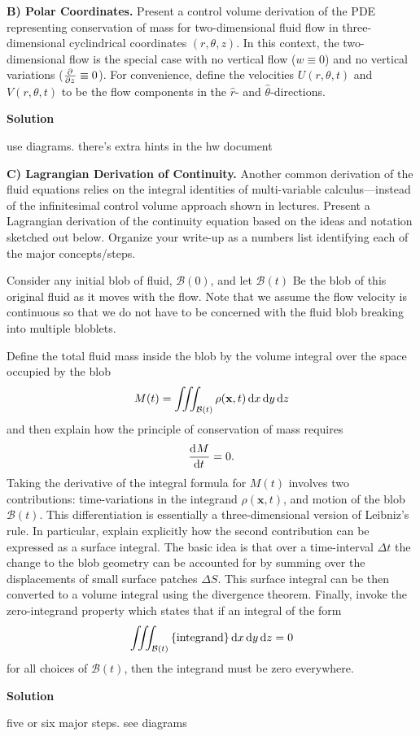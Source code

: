 \documentclass{article}
\def\*#1{\mathbf{#1}}
\newcommand{\B}{\mathcal{B}}
\begin{document}
\newpage

\textbf{B) Polar Coordinates.} Present a control volume derivation of
the PDE representing conservation of mass for two-dimensional fluid flow
in three-dimensional cyclindrical coordinates $(r, \theta, z)$. In this
context, the two-dimensional flow is the special case with no vertical
flow ($w \equiv 0$) and no vertical variations ($\pd{}{z} \equiv 0$).
For convenience, define the velocities $U(r, \theta, t)$ and $V(r,
\theta, t)$ to be the flow components in the $\hat{r}$- and
$\hat{\theta}$-directions.

\textbf{Solution}

use diagrams. there's extra hints in the hw document

\newpage

\textbf{C) Lagrangian Derivation of Continuity.} Another common
derivation of the fluid equations relies on the integral identities of
multi-variable calculus---instead of the infinitesimal control volume
approach shown in lectures. Present a Lagrangian derivation of the
continuity equation based on the ideas and notation sketched out below.
Organize your write-up as a numbers list identifying each of the major
concepts/steps.

Consider any initial blob of fluid, $\B(0)$, and let $\B(t)$ Be the blob
of this original fluid as it moves with the flow. Note that we assume
the flow velocity is continuous so that we do not have to be concerned
with the fluid blob breaking into multiple bloblets.

Define the total fluid mass inside the blob by the volume integral over
the space occupied by the blob
%
\begin{equation*}
    M(t) = \iiint_{\B(t)} \rho(\*x, t) \dif x \dif y \dif z
\end{equation*}
%
and then explain how the principle of conservation of mass requires
%
\begin{equation*}
    \dod{M}{t} = 0
    .
\end{equation*}
%
Taking the derivative of the integral formula for $M(t)$ involves two
contributions: time-variations in the integrand $\rho(\*x, t)$, and
motion of the blob $\B(t)$. This differentiation is essentially a
three-dimensional version of Leibniz's rule. In particular, explain
explicitly how the second contribution can be expressed as a surface
integral. The basic idea is that over a time-interval $\Delta t$ the
change to the blob geometry can be accounted for by summing over the
displacements of small surface patches $\Delta S$. This surface integral
can be then converted to a volume integral using the divergence theorem.
Finally, invoke the zero-integrand property which states that if an
integral of the form
%
\begin{equation*}
    \iiint_{\B(t)} \cbr{\text{integrand}} \dif x \dif y \dif z = 0
\end{equation*}
%
for all choices of $\B(t)$, then the integrand must be zero everywhere.


\textbf{Solution}

five or six major steps. see diagrams
\end{document}
